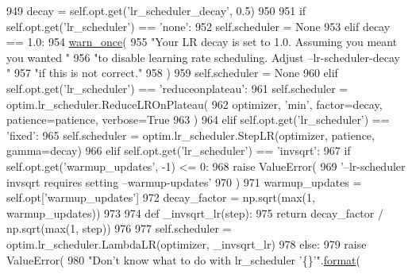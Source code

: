 \begin{DoxyCode}
949         decay = self.opt.get(\textcolor{stringliteral}{'lr\_scheduler\_decay'}, 0.5)
950 
951         \textcolor{keywordflow}{if} self.opt.get(\textcolor{stringliteral}{'lr\_scheduler'}) == \textcolor{stringliteral}{'none'}:
952             self.scheduler = \textcolor{keywordtype}{None}
953         \textcolor{keywordflow}{elif} decay == 1.0:
954             \hyperlink{namespaceparlai_1_1utils_1_1misc_acf146e70ea7f6867969a7c2b545d4b4b}{warn\_once}(
955                 \textcolor{stringliteral}{"Your LR decay is set to 1.0. Assuming you meant you wanted "}
956                 \textcolor{stringliteral}{"to disable learning rate scheduling. Adjust --lr-scheduler-decay "}
957                 \textcolor{stringliteral}{"if this is not correct."}
958             )
959             self.scheduler = \textcolor{keywordtype}{None}
960         \textcolor{keywordflow}{elif} self.opt.get(\textcolor{stringliteral}{'lr\_scheduler'}) == \textcolor{stringliteral}{'reduceonplateau'}:
961             self.scheduler = optim.lr\_scheduler.ReduceLROnPlateau(
962                 optimizer, \textcolor{stringliteral}{'min'}, factor=decay, patience=patience, verbose=\textcolor{keyword}{True}
963             )
964         \textcolor{keywordflow}{elif} self.opt.get(\textcolor{stringliteral}{'lr\_scheduler'}) == \textcolor{stringliteral}{'fixed'}:
965             self.scheduler = optim.lr\_scheduler.StepLR(optimizer, patience, gamma=decay)
966         \textcolor{keywordflow}{elif} self.opt.get(\textcolor{stringliteral}{'lr\_scheduler'}) == \textcolor{stringliteral}{'invsqrt'}:
967             \textcolor{keywordflow}{if} self.opt.get(\textcolor{stringliteral}{'warmup\_updates'}, -1) <= 0:
968                 \textcolor{keywordflow}{raise} ValueError(
969                     \textcolor{stringliteral}{'--lr-scheduler invsqrt requires setting --warmup-updates'}
970                 )
971             warmup\_updates = self.opt[\textcolor{stringliteral}{'warmup\_updates'}]
972             decay\_factor = np.sqrt(max(1, warmup\_updates))
973 
974             \textcolor{keyword}{def }\_invsqrt\_lr(step):
975                 \textcolor{keywordflow}{return} decay\_factor / np.sqrt(max(1, step))
976 
977             self.scheduler = optim.lr\_scheduler.LambdaLR(optimizer, \_invsqrt\_lr)
978         \textcolor{keywordflow}{else}:
979             \textcolor{keywordflow}{raise} ValueError(
980                 \textcolor{stringliteral}{"Don't know what to do with lr\_scheduler '\{\}'"}.\hyperlink{namespaceparlai_1_1chat__service_1_1services_1_1messenger_1_1shared__utils_a32e2e2022b824fbaf80c747160b52a76}{format}(

\end{DoxyCode}
